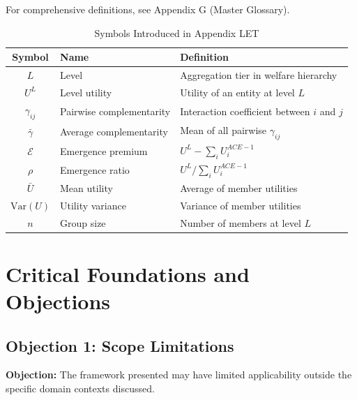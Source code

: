 For comprehensive definitions, see Appendix G (Master Glossary).

\label{sec:let-glossary}

\begin{table}[htbp]
\centering
\caption{Symbols Introduced in Appendix LET}
\label{tab:let-symbols}
\renewcommand{\arraystretch}{1.3}
\begin{tabular}{@{}clp{6cm}@{}}
\toprule
\textbf{Symbol} & \textbf{Name} & \textbf{Definition} \\
\midrule
$L$ & Level & Aggregation tier in welfare hierarchy \\
$U^L$ & Level utility & Utility of an entity at level $L$ \\
$\gamma_{ij}$ & Pairwise complementarity & Interaction coefficient between $i$ and $j$ \\
$\bar{\gamma}$ & Average complementarity & Mean of all pairwise $\gamma_{ij}$ \\
$\mathcal{E}$ & Emergence premium & $U^L - \sum_i U^{ACE-1}_i$ \\
$\rho$ & Emergence ratio & $U^L / \sum_i U^{ACE-1}_i$ \\
$\bar{U}$ & Mean utility & Average of member utilities \\
$\text{Var}(U)$ & Utility variance & Variance of member utilities \\
$n$ & Group size & Number of members at level $L$ \\
\bottomrule
\end{tabular}
\end{table}



\section{Critical Foundations and Objections}
\label{sec:let-foundations}

\subsection{Objection 1: Scope Limitations}

\textbf{Objection:} The framework presented may have limited applicability
outside the specific domain contexts discussed.

